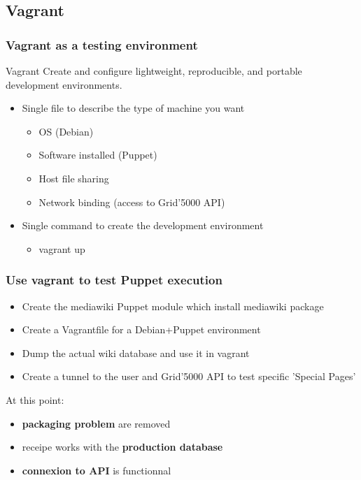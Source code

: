 \documentclass[11pt,compress]{beamer}
\begin{document}
\subsection{Vagrant}
\begin{frame}
\frametitle{Vagrant as a testing environment}
\begin{block}{Vagrant}
Create and configure lightweight, reproducible, and portable development environments.
\end{block}
\begin{itemize}
\item Single file to describe the type of machine you want
\begin{itemize}
\item OS (Debian)
\item Software installed (Puppet)
\item Host file sharing
\item Network binding (access to Grid'5000 API)
\end{itemize}
\item Single command to create the development environment
\begin{itemize}
\item vagrant up
\end{itemize}
\end{itemize}
\end{frame}

\begin{frame}
\frametitle{Use vagrant to test Puppet execution}
\begin{itemize}
\item Create the mediawiki Puppet module which install mediawiki package
\item Create a Vagrantfile for a Debian+Puppet environment
\item Dump the actual wiki database and use it in vagrant
\item Create a tunnel to the user and Grid'5000 API to test specific 'Special Pages'
\end{itemize}
\begin{block}{}
At this point:
\begin{itemize}
\item \textbf{packaging problem} are removed
\item receipe works with the \textbf{production database}
\item \textbf{connexion to API} is functionnal
\end{itemize}
\end{block}
\end{frame}
\end{document}
